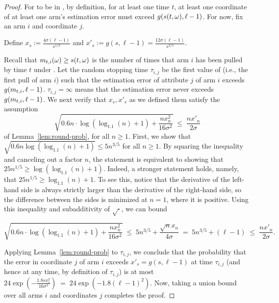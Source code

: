 \begin{proof}
For \SP to be in \Env{\ell}, by definition,
for at least one time $t$,
at least one coordinate of at least one arm's estimation error must
exceed $g(s(t,\omega),\ell-1)$.
For now, fix an arm $i$ and coordinate $j$.

Define $x_s := \frac{4 \sigma (\ell-1)}{s^{1/2}}$ and
$x'_s := g(s, \ell-1) = \frac{12 \sigma (\ell-1)}{s^{2/5}}$.

Recall that $m_{t,i}(\omega) \geq s(t,\omega)$ is the number of times
that arm $i$ has been pulled by time $t$ under \SP.
Let the random stopping time $\tau_{i,j}$ be the first value of
 (i.e., the first pull of arm $i$) such that 
the estimation error of attribute $j$ of arm $i$ exceeds
$g(m_{t,i}, \ell-1)$.
$\tau_{i,j} = \infty$ means that the estimation error never exceeds 
$g(m_{t,i}, \ell-1)$.
We next verify that $x_s, x'_s$ as we defined them satisfy the 
assumption 
\[
  \sqrt{0.6 n \cdot \log (\log_{1.1}(n) + 1) + \frac{n x_n^2}{16 \sigma^2}}
  \; \leq \; \frac{n x'_n}{2 \sigma}
\]
of Lemma~\ref{lem:round-prob}, for all $n \geq 1$.
First, we show that
$\sqrt{0.6n \log(\log_{1.1}(n)+1)} \leq 5 n^{3/5}$
for all $n \geq 1$.
By squaring the inequality and canceling out a factor $n$,
the statement is equivalent to showing that
$25 n^{1/5} \geq \log(\log_{1.1}(n)+1)$.
Indeed, a stronger statement holds, namely, that
$25 n^{1/5} \geq \log_{1.1}(n)+1$.  
To see this, notice that the derivative of the left-hand side is
always strictly larger than the derivative of the right-hand side,
so the difference between the sides is minimized at $n=1$,
where it is positive. 
Using this inequality and subadditivity of $\sqrt{\cdot}$, we can bound

\[
  \sqrt{0.6 n \cdot \log (\log_{1.1}(n) + 1) + \frac{n x_n^2}{16 \sigma^2}}
\; \leq \;
  5 n^{3/5} + \frac{\sqrt{n} x_n}{4 \sigma}
\; = \; 
  5 n^{3/5} + (\ell-1)
  \; \leq \; \frac{n x'_n}{2 \sigma}.
\]


Applying Lemma~\ref{lem:round-prob} to $\tau_{i,j}$,
we conclude that the probability that the error in coordinate $j$ of
arm $i$ exceeds $x'_s = g(s,\ell-1)$ at time $\tau_{i,j}$
(and hence at any time, by definition of $\tau_{i,j}$)
is at most
$24 \exp\left(-\frac{1.8 s x_s^2}{16 \sigma^2} \right)
\; = \; 24 \exp(-1.8 (\ell-1)^2)$.
Now, taking a union bound over all arms $i$ and
coordinates $j$ completes the proof.
\end{proof}

